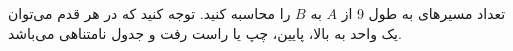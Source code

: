 \p
تعداد مسیر‌های به طول 9 از $A$ به $B$ را محاسبه کنید.
توجه کنید که در هر قدم می‌توان یک واحد به بالا، پایین، چپ یا راست رفت و جدول نامتناهی می‌باشد.

\p
{}